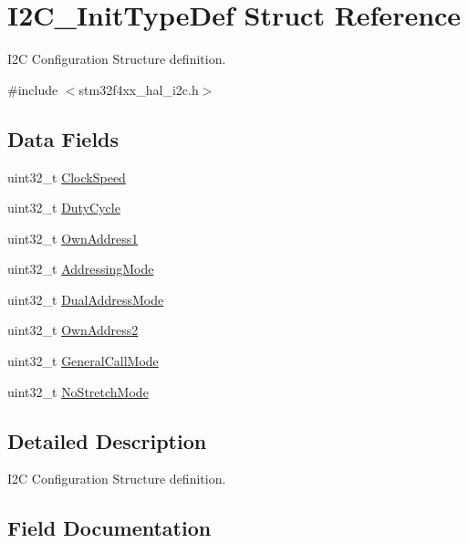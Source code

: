 \hypertarget{struct_i2_c___init_type_def}{}\section{I2\+C\+\_\+\+Init\+Type\+Def Struct Reference}
\label{struct_i2_c___init_type_def}


I2C Configuration Structure definition.  




{\ttfamily \#include $<$stm32f4xx\+\_\+hal\+\_\+i2c.\+h$>$}

\subsection*{Data Fields}
\begin{DoxyCompactItemize}
\item 
uint32\+\_\+t \mbox{\hyperlink{struct_i2_c___init_type_def_a2e90d47d6a9a180f8c3126c70102d562}{Clock\+Speed}}
\item 
uint32\+\_\+t \mbox{\hyperlink{struct_i2_c___init_type_def_a762a4d954f3ccee6017e31fe902fb1c1}{Duty\+Cycle}}
\item 
uint32\+\_\+t \mbox{\hyperlink{struct_i2_c___init_type_def_a8abec5c168e27bf11b2808c1450bdeda}{Own\+Address1}}
\item 
uint32\+\_\+t \mbox{\hyperlink{struct_i2_c___init_type_def_aa7afcb44ef1f351763d7dc69ba0f4f8c}{Addressing\+Mode}}
\item 
uint32\+\_\+t \mbox{\hyperlink{struct_i2_c___init_type_def_aabb4e156aa4af60dfaf591419e9b1a07}{Dual\+Address\+Mode}}
\item 
uint32\+\_\+t \mbox{\hyperlink{struct_i2_c___init_type_def_a6300c7a7e1b7d5444226a1bd55744f53}{Own\+Address2}}
\item 
uint32\+\_\+t \mbox{\hyperlink{struct_i2_c___init_type_def_afc70f58c0935194064d720779fbf22b5}{General\+Call\+Mode}}
\item 
uint32\+\_\+t \mbox{\hyperlink{struct_i2_c___init_type_def_a47971fd08a9784eddaa3d83fb998030c}{No\+Stretch\+Mode}}
\end{DoxyCompactItemize}


\subsection{Detailed Description}
I2C Configuration Structure definition. 

\subsection{Field Documentation}
\mbox{\label{struct_i2_c___init_type_def_aa7afcb44ef1f351763d7dc69ba0f4f8c}} 
